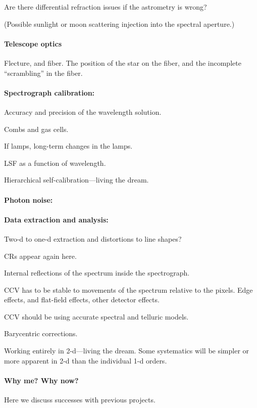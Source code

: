 \documentclass[12pt, fullpage, letterpaper]{article}
\begin{document}
Are there differential refraction issues if the astrometry is wrong?

(Possible sunlight or moon scattering injection into the spectral aperture.)

\paragraph{Telescope optics}
Flecture, and fiber. The position of the star on the fiber, and the
incomplete ``scrambling'' in the fiber.

\paragraph{Spectrograph calibration:}
Accuracy and precision of the wavelength solution.

Combs and gas cells.

If lamps, long-term changes in the lamps.

LSF as a function of wavelength.

Hierarchical self-calibration---living the dream.

\paragraph{Photon noise:}

\paragraph{Data extraction and analysis:}
Two-d to one-d extraction and distortions to line shapes?

CRs appear again here.

Internal reflections of the spectrum inside the spectrograph.

CCV has to be stable to movements of the spectrum relative to the
pixels. Edge effects, and flat-field effects, other detector effects.

CCV should be using accurate spectral and telluric models.

Barycentric corrections.

Working entirely in 2-d---living the dream. Some systematics will be
simpler or more apparent in 2-d than the individual 1-d orders.

\paragraph{Why me? Why now?}
Here we discuss successes with previous projects.
\end{document}
